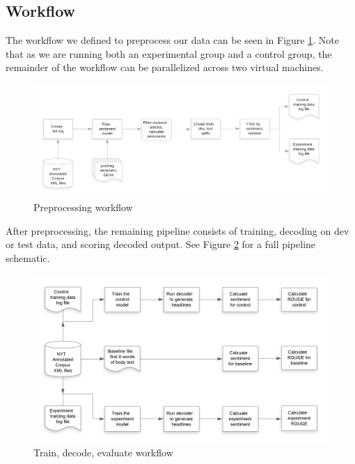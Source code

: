 \documentclass[11pt]{article}
\begin{document}
\subsection{Workflow}

The workflow we defined to preprocess our data can be seen in Figure \ref{figure:preprocess}. Note that as we are running both an experimental group and a control group, the remainder of the workflow can be parallelized across two virtual machines.

\begin{figure}
  \centering
  \includegraphics[width=\textwidth]{HeadGen_pre_p.png}
  \caption{Preprocessing workflow}
  \label{figure:preprocess}
\end{figure}

After preprocessing, the remaining pipeline consists of training, decoding on dev or test data, and scoring decoded output. See Figure \ref{figure:decode} for a full pipeline schematic.

\begin{figure}
  \centering
  \includegraphics[width=\textwidth]{HeadGen_post_p.png}
  \caption{Train, decode, evaluate workflow}
  \label{figure:decode}
\end{figure}
\end{document}
